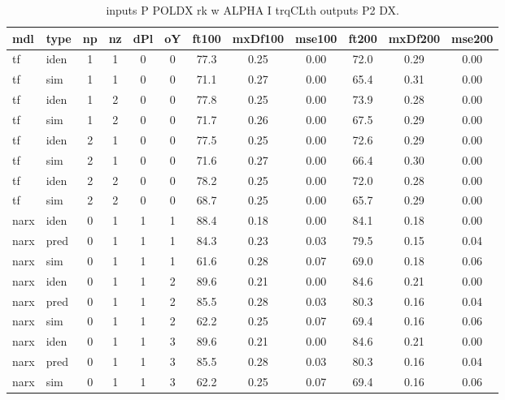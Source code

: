 \begin{center} 
\begin{longtable}{ll|cccc|ccc|ccc} 
\caption[inputs P POLDX rk w ALPHA I trqCLth   outputs P2 DX]{inputs P POLDX rk w ALPHA I trqCLth   outputs P2 DX.} 
\label{tab:inputs_P_POLDX_rk_w_ALPHA_I_trqCLth___outputs_P2_DX} 
\hline 
  mdl & type & np & nz & dPl & oY & ft100 & mxDf100 & mse100 & ft200 & mxDf200 & mse200 \\ 
 \hline 
tf  & iden & 1 & 1 & 0 & 0 & 77.3 & 0.25 & 0.00 & 72.0 & 0.29 & 0.00 \\ 
tf  & sim & 1 & 1 & 0 & 0 & 71.1 & 0.27 & 0.00 & 65.4 & 0.31 & 0.00 \\ 
 \hline 
tf  & iden & 1 & 2 & 0 & 0 & 77.8 & 0.25 & 0.00 & 73.9 & 0.28 & 0.00 \\ 
tf  & sim & 1 & 2 & 0 & 0 & 71.7 & 0.26 & 0.00 & 67.5 & 0.29 & 0.00 \\ 
 \hline 
tf  & iden & 2 & 1 & 0 & 0 & 77.5 & 0.25 & 0.00 & 72.6 & 0.29 & 0.00 \\ 
tf  & sim & 2 & 1 & 0 & 0 & 71.6 & 0.27 & 0.00 & 66.4 & 0.30 & 0.00 \\ 
 \hline 
tf  & iden & 2 & 2 & 0 & 0 & 78.2 & 0.25 & 0.00 & 72.0 & 0.28 & 0.00 \\ 
tf  & sim & 2 & 2 & 0 & 0 & 68.7 & 0.25 & 0.00 & 65.7 & 0.29 & 0.00 \\ 
 \hline 
narx & iden & 0 & 1 & 1 & 1 & 88.4 & 0.18 & 0.00 & 84.1 & 0.18 & 0.00 \\ 
narx & pred & 0 & 1 & 1 & 1 & 84.3 & 0.23 & 0.03 & 79.5 & 0.15 & 0.04 \\ 
narx & sim & 0 & 1 & 1 & 1 & 61.6 & 0.28 & 0.07 & 69.0 & 0.18 & 0.06 \\ 
 \hline 
narx & iden & 0 & 1 & 1 & 2 & 89.6 & 0.21 & 0.00 & 84.6 & 0.21 & 0.00 \\ 
narx & pred & 0 & 1 & 1 & 2 & 85.5 & 0.28 & 0.03 & 80.3 & 0.16 & 0.04 \\ 
narx & sim & 0 & 1 & 1 & 2 & 62.2 & 0.25 & 0.07 & 69.4 & 0.16 & 0.06 \\ 
 \hline 
narx & iden & 0 & 1 & 1 & 3 & 89.6 & 0.21 & 0.00 & 84.6 & 0.21 & 0.00 \\ 
narx & pred & 0 & 1 & 1 & 3 & 85.5 & 0.28 & 0.03 & 80.3 & 0.16 & 0.04 \\ 
narx & sim & 0 & 1 & 1 & 3 & 62.2 & 0.25 & 0.07 & 69.4 & 0.16 & 0.06 \\ 
 \hline 
\end{longtable} 
\end{center}